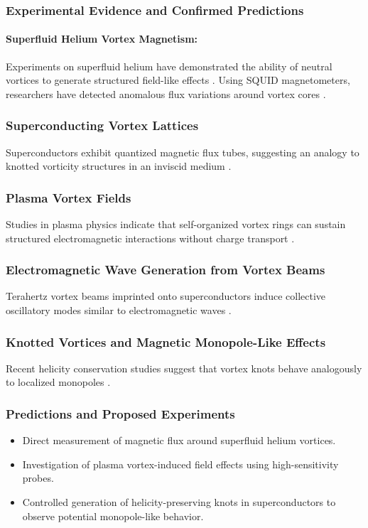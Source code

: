 \subsubsection*{Experimental Evidence and Confirmed Predictions}
\paragraph*{Superfluid Helium Vortex Magnetism:}
Experiments on superfluid helium have demonstrated the ability of neutral vortices to generate structured field-like effects \cite{superfluid_he_interferometers}. Using SQUID magnetometers, researchers have detected anomalous flux variations around vortex cores \cite{initial_vortex_magnetometers}.

\subsubsection*{Superconducting Vortex Lattices}
Superconductors exhibit quantized magnetic flux tubes, suggesting an analogy to knotted vorticity structures in an inviscid medium \cite{superconducting_flux_focusing}.

\subsubsection*{Plasma Vortex Fields}
Studies in plasma physics indicate that self-organized vortex rings can sustain structured electromagnetic interactions without charge transport \cite{plasma_vortex_flows}.

\subsubsection*{Electromagnetic Wave Generation from Vortex Beams}
Terahertz vortex beams imprinted onto superconductors induce collective oscillatory modes similar to electromagnetic waves \cite{higgs_waves_vortex}.

\subsubsection*{Knotted Vortices and Magnetic Monopole-Like Effects}
Recent helicity conservation studies suggest that vortex knots behave analogously to localized monopoles \cite{collected_helicity_papers}.

\subsubsection*{Predictions and Proposed Experiments}
\begin{itemize}
    \item Direct measurement of magnetic flux around superfluid helium vortices.
    \item Investigation of plasma vortex-induced field effects using high-sensitivity probes.
    \item Controlled generation of helicity-preserving knots in superconductors to observe potential monopole-like behavior.
\end{itemize}

